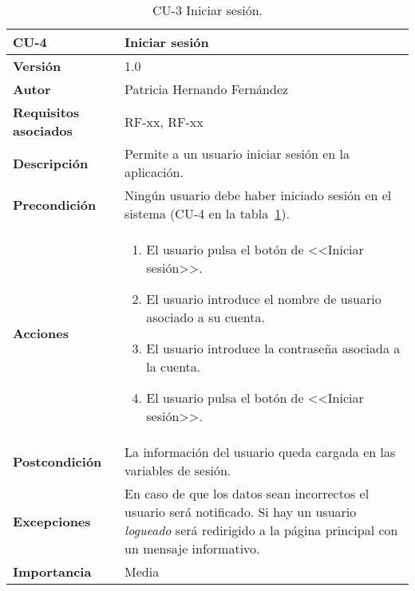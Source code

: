 \begin{table}[p]
	\centering
	\begin{tabularx}{\linewidth}{ p{} p{} }
		\toprule
		\textbf{CU-4}    & \textbf{Iniciar sesión}\\
		\toprule
		\textbf{Versión}              & 1.0    \\
		\textbf{Autor}                & Patricia Hernando Fernández \\
		\textbf{Requisitos asociados} & RF-xx, RF-xx \\
		\textbf{Descripción}          & Permite a un usuario iniciar sesión en la aplicación.\\
		\textbf{Precondición}         & Ningún usuario debe haber iniciado sesión en el sistema (CU-4 en la tabla~\ref{cu:iniciar-sesion}). \\
		\textbf{Acciones}             &
		\begin{enumerate}
			\def\labelenumi{\arabic{enumi}.}
			\tightlist
			\item El usuario pulsa el botón de <<Iniciar sesión>>.
			\item El usuario introduce el nombre de usuario asociado a su cuenta.
			\item El usuario introduce la contraseña asociada a la cuenta.
			\item El usuario pulsa el botón de <<Iniciar sesión>>.
		\end{enumerate}\\
		\textbf{Postcondición}        & La información del usuario queda cargada en las variables de sesión. \\
		\textbf{Excepciones}          & En caso de que los datos sean incorrectos el usuario será notificado. Si hay un usuario \textit{logueado} será redirigido a la página principal con un mensaje informativo.\\
		\textbf{Importancia}          & Media \\
		\bottomrule
	\end{tabularx}
	\caption{CU-3 Iniciar sesión.}
	\label{cu:iniciar-sesion}
\end{table}

